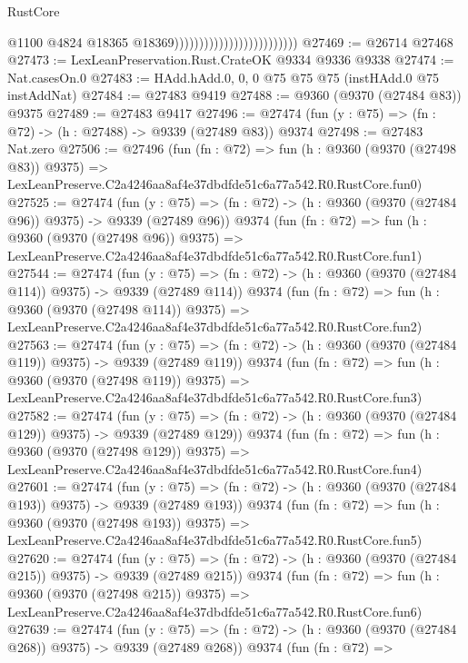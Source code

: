 \begin{lexlean}{RustCore}
\begin{coremodule}
                                                      @1100
                                                      @4824
                                                      @18365
                                                      @18369)))))))))))))))))))))))))
@27469 := @26714 @27468
@27473 := LexLeanPreservation.Rust.CrateOK @9334 @9336 @9338
@27474 := Nat.casesOn.{0}
@27483 := HAdd.hAdd.{0, 0, 0} @75 @75 @75 (instHAdd.{0} @75 instAddNat)
@27484 := @27483 @9419
@27488 := @9360 (@9370 (@27484 @83)) @9375
@27489 := @27483 @9417
@27496 := @27474 (fun (y : @75) => (fn : @72) -> (h : @27488) -> @9339 (@27489 @83)) @9374
@27498 := @27483 Nat.zero
@27506 := @27496
    (fun (fn : @72) =>
    fun (h : @9360 (@9370 (@27498 @83)) @9375) =>
    LexLeanPreserve.C2a4246aa8af4e37dbdfde51c6a77a542.R0.RustCore.fun0)
@27525 := @27474
    (fun (y : @75) => (fn : @72) -> (h : @9360 (@9370 (@27484 @96)) @9375) -> @9339 (@27489 @96))
    @9374
    (fun (fn : @72) =>
    fun (h : @9360 (@9370 (@27498 @96)) @9375) =>
    LexLeanPreserve.C2a4246aa8af4e37dbdfde51c6a77a542.R0.RustCore.fun1)
@27544 := @27474
    (fun (y : @75) => (fn : @72) -> (h : @9360 (@9370 (@27484 @114)) @9375) -> @9339 (@27489 @114))
    @9374
    (fun (fn : @72) =>
    fun (h : @9360 (@9370 (@27498 @114)) @9375) =>
    LexLeanPreserve.C2a4246aa8af4e37dbdfde51c6a77a542.R0.RustCore.fun2)
@27563 := @27474
    (fun (y : @75) => (fn : @72) -> (h : @9360 (@9370 (@27484 @119)) @9375) -> @9339 (@27489 @119))
    @9374
    (fun (fn : @72) =>
    fun (h : @9360 (@9370 (@27498 @119)) @9375) =>
    LexLeanPreserve.C2a4246aa8af4e37dbdfde51c6a77a542.R0.RustCore.fun3)
@27582 := @27474
    (fun (y : @75) => (fn : @72) -> (h : @9360 (@9370 (@27484 @129)) @9375) -> @9339 (@27489 @129))
    @9374
    (fun (fn : @72) =>
    fun (h : @9360 (@9370 (@27498 @129)) @9375) =>
    LexLeanPreserve.C2a4246aa8af4e37dbdfde51c6a77a542.R0.RustCore.fun4)
@27601 := @27474
    (fun (y : @75) => (fn : @72) -> (h : @9360 (@9370 (@27484 @193)) @9375) -> @9339 (@27489 @193))
    @9374
    (fun (fn : @72) =>
    fun (h : @9360 (@9370 (@27498 @193)) @9375) =>
    LexLeanPreserve.C2a4246aa8af4e37dbdfde51c6a77a542.R0.RustCore.fun5)
@27620 := @27474
    (fun (y : @75) => (fn : @72) -> (h : @9360 (@9370 (@27484 @215)) @9375) -> @9339 (@27489 @215))
    @9374
    (fun (fn : @72) =>
    fun (h : @9360 (@9370 (@27498 @215)) @9375) =>
    LexLeanPreserve.C2a4246aa8af4e37dbdfde51c6a77a542.R0.RustCore.fun6)
@27639 := @27474
    (fun (y : @75) => (fn : @72) -> (h : @9360 (@9370 (@27484 @268)) @9375) -> @9339 (@27489 @268))
    @9374
    (fun (fn : @72) =>

\end{coremodule}
\end{lexlean}

